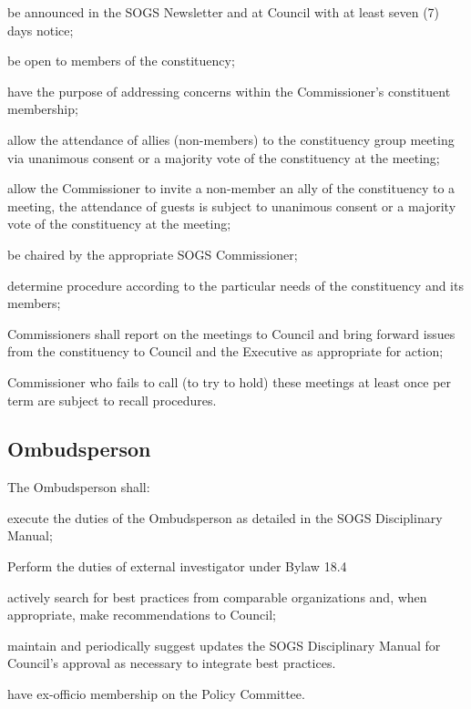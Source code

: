 \begin{longenum}[ label*=\thesubsection.\arabic*., align=left]
\begin{longenum}[ label*=\arabic*., align=left]
\item be announced in the SOGS Newsletter and at Council with at least seven (7) days notice;
\item be open to members of the constituency;
\item have the purpose of addressing concerns within the Commissioner’s constituent membership;
\item allow the attendance of allies (non-members) to the constituency group meeting via unanimous consent or a majority vote of the constituency at the meeting;
\item allow the Commissioner to invite a non-member an ally of the constituency to a meeting, the attendance of guests is subject to unanimous consent or a majority vote of the constituency at the meeting;
\item be chaired by the appropriate SOGS Commissioner;
\item determine procedure according to the particular needs of the constituency and its members;
\end{longenum}
\item Commissioners shall report on the meetings to Council and bring forward issues from the constituency to Council and the Executive as appropriate for action;
\item Commissioner who fails to call (to try to hold) these meetings at least once per term are subject to recall procedures.
\end{longenum}


\subsection{Ombudsperson}
The Ombudsperson shall:
\begin{longenum}[ label*=\thesubsection.\arabic*., align=left]


\item execute the duties of the Ombudsperson as detailed in the SOGS Disciplinary Manual; 
\item Perform the duties of external investigator under Bylaw 18.4
\item actively search for best practices from comparable organizations and, when appropriate, make recommendations to Council;
\item maintain and periodically suggest updates the SOGS Disciplinary Manual for Council’s approval
as necessary to integrate best practices.
\item have ex-officio membership on the Policy Committee.
\end{longenum}
